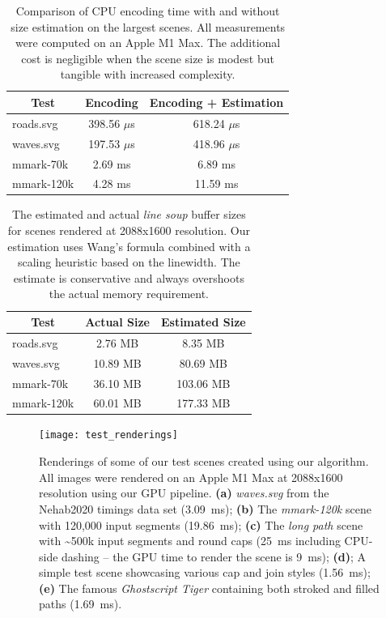 \documentclass[sigconf, nonacm]{acmart}
\begin{document}
\begin{table}
    \caption{Comparison of CPU encoding time with and without size estimation on the largest scenes. All measurements were computed on an Apple M1 Max. The additional cost is negligible when the scene size is modest but tangible with increased complexity.}
    \begin{tabular}{|l|c|c|}
    \hline
        \multicolumn{1}{|c|}{\textbf{Test}} & \textbf{Encoding} & \textbf{Encoding + Estimation} \\
    \hline
        roads.svg  & 398.56 $\mu$s & 618.24 $\mu$s \\
        waves.svg  & 197.53 $\mu$s & 418.96 $\mu$s \\
        mmark-70k  & 2.69 ms       & 6.89 ms       \\
        mmark-120k & 4.28 ms       & 11.59 ms      \\
    \hline
    \end{tabular}
    \label{table:bump-estimate-cost}
\end{table}

\begin{table}
    \caption{The estimated and actual \emph{line soup} buffer sizes for scenes rendered at 2088x1600 resolution. Our estimation uses Wang's formula combined with a scaling heuristic based on the linewidth. The estimate is conservative and always overshoots the actual memory requirement.}
    \begin{tabular}{|l|c|c|}
    \hline
        \multicolumn{1}{|c|}{\textbf{Test}} & Actual Size & Estimated Size \\
    \hline
        roads.svg  & 2.76 MB   & 8.35 MB    \\
        waves.svg  & 10.89 MB  & 80.69 MB   \\
        mmark-70k  & 36.10 MB  & 103.06 MB  \\
        mmark-120k & 60.01 MB  & 177.33 MB  \\
    \hline
    \end{tabular}
    \label{table:bump-estimate-mem}
\end{table}

\begin{figure}
    \centering
    \texttt{[image: test\_renderings]}
    \caption{Renderings of some of our test scenes created using our algorithm. All images were rendered on an Apple M1 Max at 2088x1600 resolution using our GPU pipeline. \textbf{(a)} \emph{waves.svg} from the Nehab2020 timings data set (3.09~ms); \textbf{(b)} The \emph{mmark-120k} scene with 120,000 input segments (19.86~ms); \textbf{(c)} The \emph{long path} scene with \textasciitilde500k input segments and round caps (25~ms including CPU-side dashing -- the GPU time to render the scene is 9~ms); \textbf{(d)}; A simple test scene showcasing various cap and join styles (1.56~ms); \textbf{(e)} The famous \emph{Ghostscript Tiger} containing both stroked and filled paths (1.69~ms).}
    \label{fig:renderings}
\end{figure}
\end{document}
